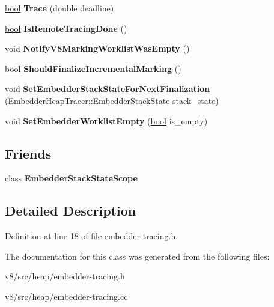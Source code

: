\begin{DoxyCompactItemize}
\mbox{\hyperlink{classbool}{bool}} {\bfseries Trace} (double deadline)
\item 
\mbox{\label{classv8_1_1internal_1_1LocalEmbedderHeapTracer_a9eb834ac35486fe37d6be8194d1105bd}} 
\mbox{\hyperlink{classbool}{bool}} {\bfseries Is\+Remote\+Tracing\+Done} ()
\item 
\mbox{\label{classv8_1_1internal_1_1LocalEmbedderHeapTracer_a200bc51a33c9114a8ef0e64c57d44ee7}} 
void {\bfseries Notify\+V8\+Marking\+Worklist\+Was\+Empty} ()
\item 
\mbox{\label{classv8_1_1internal_1_1LocalEmbedderHeapTracer_ac9cbeb1fd6db44fa8a158ef96d48d114}} 
\mbox{\hyperlink{classbool}{bool}} {\bfseries Should\+Finalize\+Incremental\+Marking} ()
\item 
\mbox{\label{classv8_1_1internal_1_1LocalEmbedderHeapTracer_a20cd0d475b1472af899effe2270236f8}} 
void {\bfseries Set\+Embedder\+Stack\+State\+For\+Next\+Finalization} (Embedder\+Heap\+Tracer\+::\+Embedder\+Stack\+State stack\+\_\+state)
\item 
\mbox{\label{classv8_1_1internal_1_1LocalEmbedderHeapTracer_acb79ebab34cb342772b4fe28145f0e0b}} 
void {\bfseries Set\+Embedder\+Worklist\+Empty} (\mbox{\hyperlink{classbool}{bool}} is\+\_\+empty)
\end{DoxyCompactItemize}
\subsection*{Friends}
\begin{DoxyCompactItemize}
\item 
\mbox{\label{classv8_1_1internal_1_1LocalEmbedderHeapTracer_aaf13071c4075ae60eb0b224f5eaacdb8}} 
class {\bfseries Embedder\+Stack\+State\+Scope}
\end{DoxyCompactItemize}


\subsection{Detailed Description}


Definition at line 18 of file embedder-\/tracing.\+h.



The documentation for this class was generated from the following files\+:\begin{DoxyCompactItemize}
\item 
v8/src/heap/embedder-\/tracing.\+h\item 
v8/src/heap/embedder-\/tracing.\+cc\end{DoxyCompactItemize}
